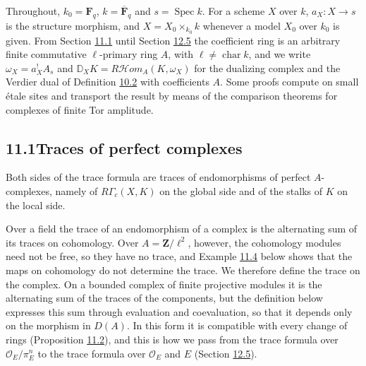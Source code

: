 \documentclass[11pt]{article}
\providecommand{\cHom}{}\renewcommand{\cHom}{R\mathcal{H}\!om}
\begin{document}
Throughout, \(k_0=\mathbf F_q\), \(k=\overline{\mathbf F}_q\) and \(s=\operatorname{Spec}k\). For a scheme \(X\) over \(k\), \(a_X:X\to s\) is the structure morphism, and \(X=X_0\times_{k_0}k\) whenever a model \(X_0\) over \(k_0\) is given. From Section \hyperref[bp172]{11.1} until Section \hyperref[bp289]{12.5} the coefficient ring is an arbitrary finite commutative \(\ell\)-primary ring \(A\), with \(\ell\ne\operatorname{char}k\), and we write \(\omega_X=a_X^!A_s\) and \(\mathbb D_XK=\cHom_A(K,\omega_X)\) for the dualizing complex and the Verdier dual of Definition \hyperref[bp108]{10.2} with coefficients \(A\). Some proofs compute on small étale sites and transport the result by means of the comparison theorems for complexes of finite Tor amplitude.

\subsection*{\texorpdfstring{11.1\quad Traces of perfect complexes}{11.1 Traces of perfect complexes}}
\label{bp172}%
\label{bp173}%
Both sides of the trace formula are traces of endomorphisms of perfect \(A\)-complexes, namely of \(R\Gamma_c(X,K)\) on the global side and of the stalks of \(K\) on the local side.

Over a field the trace of an endomorphism of a complex is the alternating sum of its traces on cohomology. Over \(A=\mathbf Z/\ell^2\), however, the cohomology modules need not be free, so they have no trace, and Example \hyperref[bp181]{11.4} below shows that the maps on cohomology do not determine the trace. We therefore define the trace on the complex. On a bounded complex of finite projective modules it is the alternating sum of the traces of the components, but the definition below expresses this sum through evaluation and coevaluation, so that it depends only on the morphism in \(D(A)\). In this form it is compatible with every change of rings (Proposition \hyperref[bp176]{11.2}), and this is how we pass from the trace formula over \(\mathcal O_E/\pi_E^n\) to the trace formula over \(\mathcal O_E\) and \(E\) (Section \hyperref[bp289]{12.5}).
\end{document}

